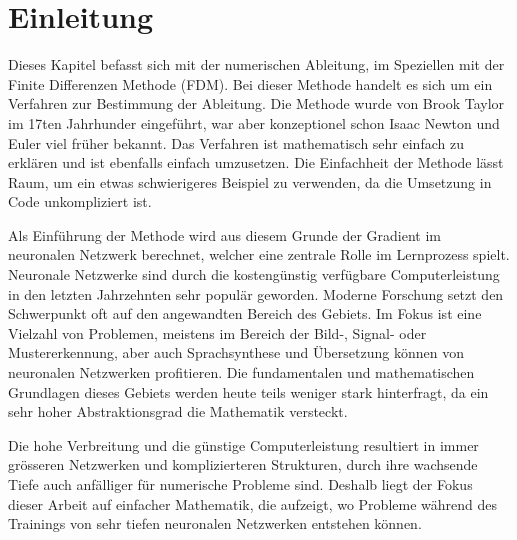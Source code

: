 %
%
%
\section{Einleitung\label{ableitung:section:einleitung}}
Dieses Kapitel befasst sich mit der numerischen Ableitung, im Speziellen mit der Finite Differenzen Methode (FDM).
Bei dieser Methode handelt es sich um ein Verfahren zur Bestimmung der Ableitung.
Die Methode wurde von Brook Taylor im 17ten Jahrhunder eingeführt, war aber konzeptionel schon Isaac Newton und Euler viel früher bekannt. 
Das Verfahren ist mathematisch sehr einfach zu erklären und ist ebenfalls einfach umzusetzen. Die Einfachheit der Methode lässt Raum, um ein etwas schwierigeres Beispiel zu verwenden, da die Umsetzung in Code unkompliziert ist.

Als Einführung der Methode wird aus diesem Grunde der Gradient im neuronalen Netzwerk berechnet, welcher eine zentrale Rolle im Lernprozess spielt.
Neuronale Netzwerke sind durch die kostengünstig verfügbare Computerleistung in den letzten Jahrzehnten sehr populär geworden. Moderne Forschung setzt den Schwerpunkt oft auf den angewandten Bereich des Gebiets. Im Fokus ist eine Vielzahl von Problemen, meistens im Bereich der Bild-, Signal- oder Mustererkennung, aber auch Sprachsynthese und Übersetzung können von neuronalen Netzwerken profitieren. Die fundamentalen und mathematischen Grundlagen dieses Gebiets werden heute teils weniger stark hinterfragt, da ein sehr hoher Abstraktionsgrad die Mathematik versteckt.

Die hohe Verbreitung und die günstige Computerleistung resultiert in immer grösseren Netzwerken und komplizierteren Strukturen, durch ihre wachsende Tiefe auch anfälliger für numerische Probleme sind. Deshalb liegt der Fokus dieser Arbeit auf einfacher Mathematik, die aufzeigt, wo Probleme während des Trainings von sehr tiefen neuronalen Netzwerken entstehen können.